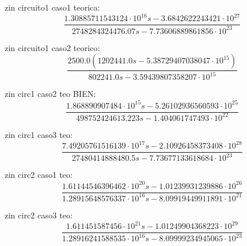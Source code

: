 zin circuito1 caso1 teorica:
\begin{equation}
\frac{1.30885711543124 \cdot 10^{16} s - 3.6842622243421 \cdot 10^{27}}{2748284324476.07 s - 7.73606889861856 \cdot 10^{23}}
\end{equation}

zin circuito1 caso2 teorico:
\begin{equation}
\frac{2500.0 \left(1202441.0 s - 5.38729407038047 \cdot 10^{15}\right)}{802241.0 s - 3.59439807358207 \cdot 10^{15}}
\end{equation}

zin circ1 caso2 teo BIEN:
\begin{equation}
\frac{1.868890907484 \cdot 10^{15} s - 5.26102936560593 \cdot 10^{25}}{498752424613.223 s - 1.404061747493 \cdot 10^{22}}
\end{equation}

zin circ1 caso3 teo:
\begin{equation}
\frac{7.49205761516139 \cdot 10^{17} s - 2.10926458373408 \cdot 10^{28}}{27480414888480.5 s - 7.73677133618684 \cdot 10^{23}}
\end{equation}


zin circ2 caso1 teo:
\begin{equation}
\frac{1.61144546396462 \cdot 10^{20} s - 1.01239931239886 \cdot 10^{26}}{1.28915648576337 \cdot 10^{16} s - 8.09919449911891 \cdot 10^{21}}
\end{equation}

zin circ2 caso3 teo:
\begin{equation}
\frac{1.611451587456 \cdot 10^{21} s - 1.01249904368223 \cdot 10^{29}}{1.28916241588535 \cdot 10^{16} s - 8.09999234945065 \cdot 10^{23}}
\end{equation}

